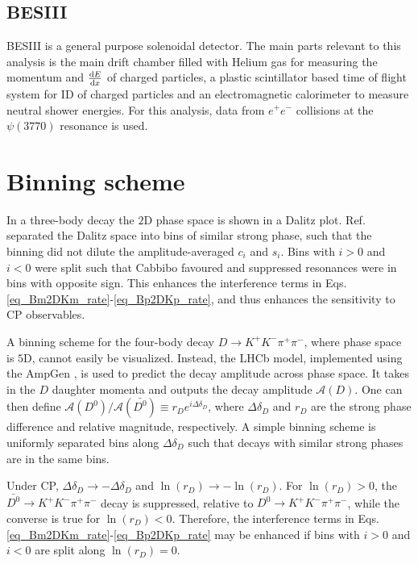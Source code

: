 \documentclass[12pt, a4paper, notitlepage, onecolumn]{article}
\numberwithin{equation}{section}
\begin{document}
\subsection{BESIII}
\noindent BESIII \cite{cite_BESIII} is a general purpose solenoidal detector. The main parts relevant to this analysis is the main drift chamber filled with Helium gas for measuring the momentum and $\dv{E}{x}$ of charged particles, a plastic scintillator based time of flight system for ID of charged particles and an electromagnetic calorimeter to measure neutral shower energies. For this analysis, data from $e^+e^-$ collisions at the $\psi(3770)$ resonance is used.

\section{Binning scheme}
\label{section_binning_scheme}
\noindent In a three-body decay the $2$D phase space is shown in a Dalitz plot. Ref. \cite{cite_LHCbGGSZKSpipi} separated the Dalitz space into bins of similar strong phase, such that the binning did not dilute the amplitude-averaged $c_i$ and $s_i$. Bins with $i > 0$ and $i < 0$ were split such that Cabbibo favoured and suppressed resonances were in bins with opposite sign. This enhances the interference terms in Eqs. \eqref{eq_Bm2DKm_rate}-\eqref{eq_Bp2DKp_rate}, and thus enhances the sensitivity to CP observables.

A binning scheme for the four-body decay $D\to K^+K^-\pi^+\pi^-$, where phase space is $5$D, cannot easily be visualized. Instead, the LHCb model, implemented using the AmpGen \cite{cite_AmpGen}, is used to predict the decay amplitude across phase space. It takes in the $D$ daughter momenta and outputs the decay amplitude $\mathcal{A}(D)$. One can then define $\mathcal{A}(D^0)/\mathcal{A}(\bar{D^0})\equiv r_De^{i\Delta\delta_D}$, where $\Delta\delta_D$ and $r_D$ are the strong phase difference and relative magnitude, respectively. A simple binning scheme is uniformly separated bins along $\Delta\delta_D$ such that decays with similar strong phases are in the same bins.

Under CP, $\Delta\delta_D\to -\Delta\delta_D$ and $\ln(r_D)\to -\ln(r_D)$. For $\ln(r_D) > 0$, the $\bar{D^0}\to K^+K^-\pi^+\pi^-$ decay is suppressed, relative to $D^0\to K^+K^-\pi^+\pi^-$, while the converse is true for $\ln(r_D) < 0$. Therefore, the interference terms in Eqs. \eqref{eq_Bm2DKm_rate}-\eqref{eq_Bp2DKp_rate} may be enhanced if bins with $i > 0$ and $i < 0$ are split along $\ln(r_D) = 0$.
\end{document}
